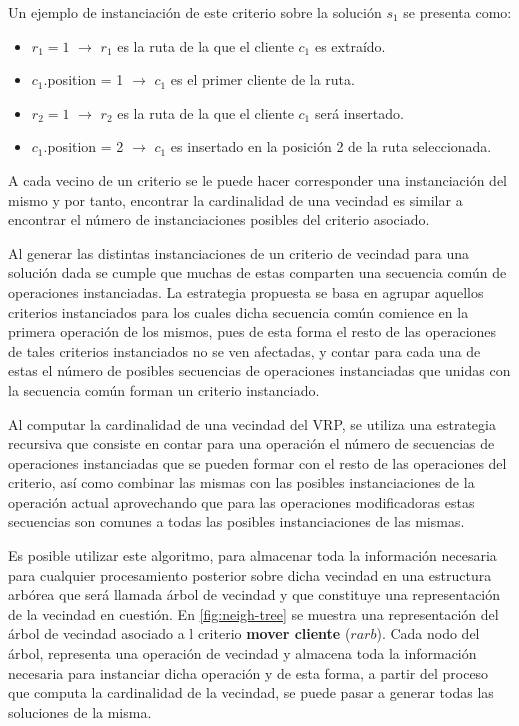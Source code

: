 Un ejemplo de instanciación de este criterio sobre la solución $s_1$ se presenta como:

\begin{itemize}
	\item $r_1 = 1$ $\rightarrow$ $r_1$ es la ruta de la que el cliente $c_1$ es extraído.
	\item $c_1$.position = 1 $\rightarrow$ $c_1$ es el primer cliente de la ruta.
	\item $r_2 = 1$ $\rightarrow$ $r_2$ es la ruta de la que el cliente $c_1$ será insertado.
	\item $c_1$.position = 2 $\rightarrow$ $c_1$ es insertado en la posición 2 de la ruta seleccionada.
\end{itemize}

A cada vecino de un criterio se le puede hacer corresponder una instanciación del mismo y por tanto, encontrar la cardinalidad de una vecindad es similar a encontrar el número de instanciaciones posibles del criterio asociado.

Al generar las distintas instanciaciones de un criterio de vecindad para
una solución dada se cumple que muchas de estas comparten una secuencia común de operaciones instanciadas. La estrategia propuesta se basa en
agrupar aquellos criterios instanciados para los cuales dicha secuencia común comience en la primera operación de los mismos, pues de esta forma
el resto de las operaciones de tales criterios instanciados no se ven afectadas, y contar para cada una de estas el número de posibles secuencias de operaciones instanciadas que unidas con la secuencia común forman un
criterio instanciado.

Al computar la cardinalidad de una vecindad del VRP, se utiliza una
estrategia recursiva que consiste en contar para una operación el número
de secuencias de operaciones instanciadas que se pueden formar con el
resto de las operaciones del criterio, así como combinar las mismas con
las posibles instanciaciones de la operación actual aprovechando que para
las operaciones modificadoras estas secuencias son comunes a todas las
posibles instanciaciones de las mismas.

Es posible utilizar este algoritmo, para almacenar toda la información
necesaria para cualquier procesamiento posterior sobre dicha vecindad en
una estructura arbórea que será llamada árbol de vecindad y que constituye
una representación de la vecindad en cuestión. En \ref{fig:neigh-tree} se muestra una representación del árbol de vecindad asociado a l criterio \textbf{mover cliente} ($rarb$). Cada nodo del árbol, representa una
operación de vecindad y almacena toda la información necesaria para instanciar dicha operación y de esta forma, a partir del proceso que computa
la cardinalidad de la vecindad, se puede pasar a generar todas las soluciones de la misma.


